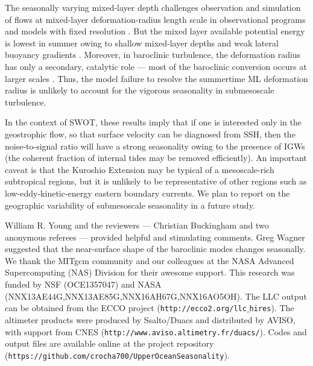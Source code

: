 \documentclass[grl]{agutex2015}
\begin{document}
\begin{article}
The seasonally varying mixed-layer depth challenges observation and simulation of
flows at mixed-layer deformation-radius length scale in observational programs and models with
fixed resolution \citep{buckingham_etal2016}. But the mixed layer available potential energy
is lowest in summer owing to shallow mixed-layer depths and weak lateral buoyancy
gradients \citep{callies_etal2015}. Moreover, in baroclinic turbulence, the deformation
radius has only a secondary, catalytic role --- most of the baroclinic conversion occurs at
larger scales \citep{larichev_held1995,callies_etal2016}.
Thus, the model failure to resolve the summertime
ML deformation radius is unlikely to account for the vigorous seasonality in submesoscale
turbulence.


In the context of SWOT, these results imply that if one is interested
only in the geostrophic flow, so that surface velocity can be diagnosed
from SSH, then the noise-to-signal ratio will have a strong seasonality owing
to the presence of IGWs (the coherent fraction of internal tides may be removed
efficiently).
An important caveat is that the Kuroshio Extension may be typical of a mesoscale-rich
subtropical regions, but it is unlikely to be
representative of other regions such as low-eddy-kinetic-energy eastern boundary
currents.  We plan to report on the geographic variability of submesoscale
seasonality in a future study.




%

\begin{acknowledgments}
 William R. Young and the reviewers --- Christian Buckingham and two anonymous referees ---
  provided helpful and stimulating comments. Greg Wagner
 suggested that the near-surface shape of the baroclinic modes changes seasonally.
 We thank the MITgcm community and our colleagues at the NASA Advanced
Supercomputing (NAS) Division for their awesome support.
This research was funded by NSF (OCE1357047) and NASA (NNX13AE44G,NNX13AE85G,NNX16AH67G,NNX16AO5OH).
The LLC output can be obtained from the ECCO project (\texttt{http://ecco2.org/llc$\_$hires}). The altimeter products were produced by Ssalto/Duacs
and distributed by AVISO, with support from CNES (\texttt{http://www.aviso.altimetry.fr/duacs/}).
Codes and output files are available online at the project repository
 (\texttt{https://github.com/crocha700/UpperOceanSeasonality}).
\end{acknowledgments}


\end{article}
\end{document}
